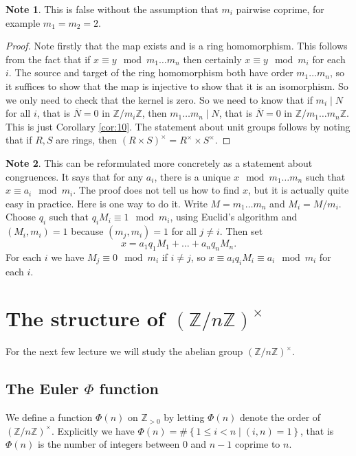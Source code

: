 \documentclass{article}
\newcommand{\Z}{\mathbb{Z}}
\newcommand{\rb}[1]{\left( #1 \right)}
\newcommand{\cb}[1]{\left\{ #1 \right\}}
\newcommand{\unit}[1]{\rb{\Z / #1\Z}^\times}
\theoremstyle{definition}\newtheorem{definition}{Definition}
\theoremstyle{definition}\newtheorem{remark}[definition]{Remark}
\theoremstyle{definition}\newtheorem*{example}{Example}
\theoremstyle{definition}\newtheorem*{note}{Note}
\begin{document}
\begin{note}
This is false without the assumption that $ m_i $ pairwise coprime, for example $ m_1 = m_2 = 2 $.
\end{note}

\begin{proof}
Note firstly that the map exists and is a ring homomorphism. This follows from the fact that if $ x \equiv y \mod m_1 \dots m_n $ then certainly $ x \equiv y \mod m_i $ for each $ i $. The source and target of the ring homomorphism both have order $ m_1 \dots m_n $, so it suffices to show that the map is injective to show that it is an isomorphism. So we only need to check that the kernel is zero. So we need to know that if $ m_i \mid N $ for all $ i $, that is $ \overline{N} = 0 $ in $ \Z / m_i\Z $, then $ m_1 \dots m_n \mid N $, that is $ \overline{N} = 0 $ in $ \Z / m_1 \dots m_n\Z $. This is just Corollary \ref{cor:10}. The statement about unit groups follows by noting that if $ R, S $ are rings, then $ \rb{R \times S}^\times = R^\times \times S^\times $.
\end{proof}

\begin{note}
This can be reformulated more concretely as a statement about congruences. It says that for any $ a_i $, there is a unique $ x \mod m_1 \dots m_n $ such that $ x \equiv a_i \mod m_i $. The proof does not tell us how to find $ x $, but it is actually quite easy in practice. Here is one way to do it. Write $ M = m_1 \dots m_n $ and $ M_i = M / m_i $. Choose $ q_i $ such that $ q_iM_i \equiv 1 \mod m_i $, using Euclid's algorithm and $ \rb{M_i, m_i} = 1 $ because $ \rb{m_j, m_i} = 1 $ for all $ j \ne i $. Then set
$$ x = a_1q_1M_1 + \dots + a_nq_nM_n. $$
For each $ i $ we have $ M_j \equiv 0 \mod m_i $ if $ i \ne j $, so $ x \equiv a_iq_iM_i \equiv a_i \mod m_i $ for each $ i $.
\end{note}

\section{The structure of $ \unit{n} $}

For the next few lecture we will study the abelian group $ \unit{n} $.

\subsection{The Euler $ \Phi $ function}

We define a function $ \Phi\rb{n} $ on $ \Z_{> 0} $ by letting $ \Phi\rb{n} $ denote the order of $ \unit{n} $. Explicitly we have $ \Phi\rb{n} = \#\cb{1 \le i < n \mid \rb{i, n} = 1} $, that is $ \Phi\rb{n} $ is the number of integers between $ 0 $ and $ n - 1 $ coprime to $ n $.
\end{document}
